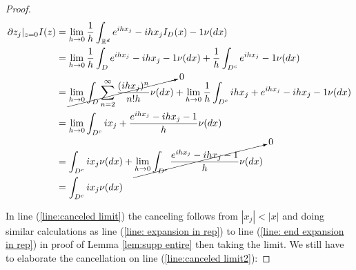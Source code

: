 \documentclass[a4paper,11pt]{article}
\begin{document}
\begin{proof}
    \begin{align}
        \partial z_{j}|_{z=0} I(z) & = \lim_{h \to 0} \frac{1}{h} \int_{\mathbb{R}^d} e^{ihx_{j}}-ihx_{j} I_{D}(x)-1 \nu(dx)                                                                                                                     \\
                                   & = \lim_{h \to 0} \frac{1}{h} \int_{D} e^{ihx_{j}}-ihx_{j}-1  \nu(dx) + \frac{1}{h} \int_{D^{c}} e^{ihx_{j}}-1  \nu(dx)                                                                                      \\
                                   & = \cancelto{0}{\lim_{h \to 0} \int_{D} \sum_{n=2}^{\infty} \frac{(ihx_{j})^{n}}{n!h}  \nu(dx)} + \lim_{h \to 0} \frac{1}{h}\int_{D^{c}} ihx_{j}+ e^{ihx_{j}}-ihx_{j}-1  \nu(dx) \label{line:canceled limit} \\
                                   & =  \lim_{h \to 0} \int_{D^{c}}ix_{j} + \frac{e^{ihx_{j}}-ihx_{j}-1}{h} \nu(dx)                                                                                                                              \\
                                   & =  \int_{D^{c}}ix_{j}\nu(dx) + \cancelto{0}{\lim_{h \to 0} \int_{D^{c}}\frac{e^{ihx_{j}}-ihx_{j}-1}{h} \nu(dx)} \label{line:canceled limit2}                                                                \\
                                   & = \int_{D^{c}}ix_{j}\nu(dx)
    \end{align}

    In line (\ref{line:canceled limit}) the canceling follows from $|x_{j}|<|x|$ and doing similar calculations as
    line (\ref{line: expansion in rep}) to line (\ref{line: end expansion in rep}) in proof of Lemma \ref{lem:supp entire} then taking the limit. We still have to elaborate the cancellation on line (\ref{line:canceled limit2}):


\end{proof}
\end{document}
